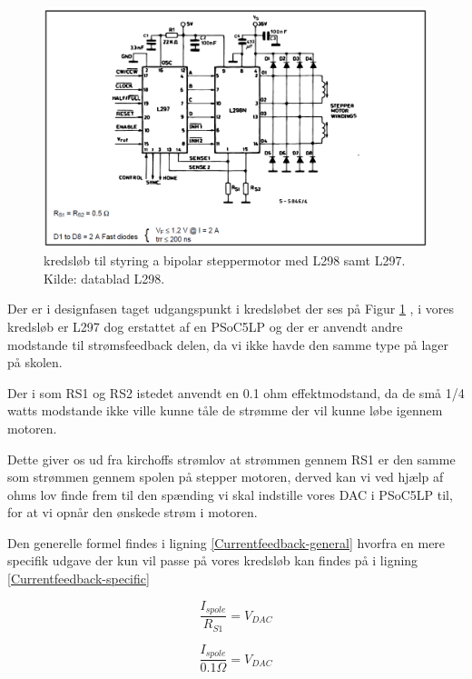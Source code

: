 \begin{figure}[H]
	\centering
	\includegraphics[scale=0.5]{Billeder/kredsloebL297L298}
	\caption{kredsløb til styring a bipolar steppermotor med L298 samt L297. Kilde: datablad L298.}
	\label{L298L297}
\end{figure}

Der er i designfasen taget udgangspunkt i kredsløbet der ses på Figur \ref{L298L297} , i vores kredsløb er L297 dog erstattet af en PSoC5LP og der er anvendt
andre modstande til strømsfeedback delen, da vi ikke havde den samme type på lager på skolen.

Der i som RS1 og RS2 istedet anvendt en 0.1 ohm effektmodstand, da de små 1/4 watts modstande ikke ville kunne tåle de strømme der vil kunne løbe igennem motoren.

Dette giver os ud fra kirchoffs strømlov at strømmen gennem RS1 er den samme som strømmen gennem spolen på stepper motoren, derved kan vi ved hjælp af ohms lov
finde frem til den spænding vi skal indstille vores DAC i PSoC5LP til, for at vi opnår den ønskede strøm i motoren.

Den generelle formel findes i ligning \ref{Currentfeedback-general} hvorfra en mere specifik udgave der kun vil passe på vores kredsløb kan findes på i ligning
\ref{Currentfeedback-specific}

\begin{equation}
\label{Currentfeedback-general}
	\frac{I_{spole}}{R_{S1}}=V_{DAC}
\end{equation}

\begin{equation}
\label{Currentfeedback-specific}
\frac{I_{spole}}{0.1\Omega}=V_{DAC}
\end{equation}

